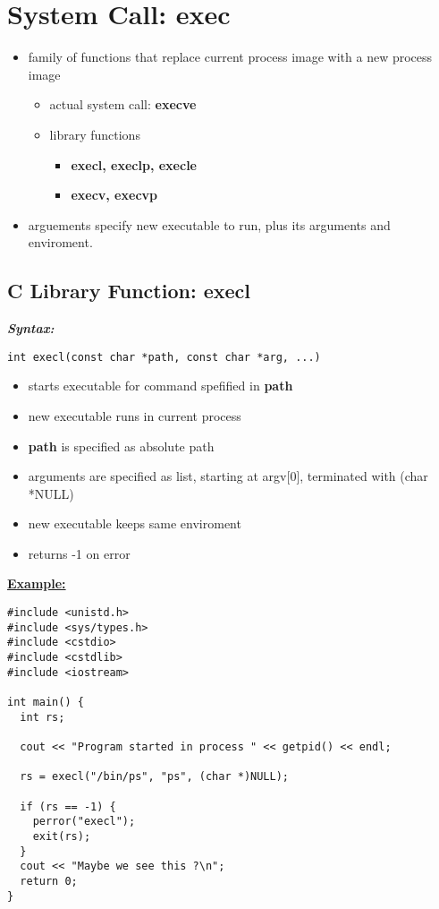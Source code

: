 \documentclass{report}
\begin{document}
\section{System Call: exec}
\begin{itemize}
  \item family of functions that replace current process image with a new process image
    \begin{itemize}[label=$\circ$]
      \item actual system call: \textbf{execve}
      \item library functions
        \begin{itemize}[label=$\circ$]
          \item \textbf{execl, execlp, execle}
          \item \textbf{execv, execvp}
        \end{itemize}
    \end{itemize}
      \item arguements specify new executable to run, plus its arguments and enviroment.
\end{itemize}
\subsection{C Library Function: execl}
\bigbreak \noindent
\textbf{\textit{Syntax:}}
\begin{verbatim}
int execl(const char *path, const char *arg, ...)
\end{verbatim}
\begin{itemize}
  \item starts executable for command spefified in \textbf{path}
  \item new executable runs in current process
  \item \textbf{path} is specified as absolute path
  \item arguments are specified as list, starting at argv[0],
    \subitem terminated with (char *NULL)
  \item new executable keeps same enviroment
  \item returns -1 on error
\end{itemize}
\bigbreak \noindent
\textbf{\underline{Example:}}
\begin{mdframed}
\begin{verbatim}
#include <unistd.h>
#include <sys/types.h>
#include <cstdio>
#include <cstdlib>
#include <iostream>

int main() {
  int rs;

  cout << "Program started in process " << getpid() << endl;

  rs = execl("/bin/ps", "ps", (char *)NULL);

  if (rs == -1) {
    perror("execl");
    exit(rs);
  }
  cout << "Maybe we see this ?\n";
  return 0;
}
\end{verbatim}
\end{mdframed}
\end{document}
